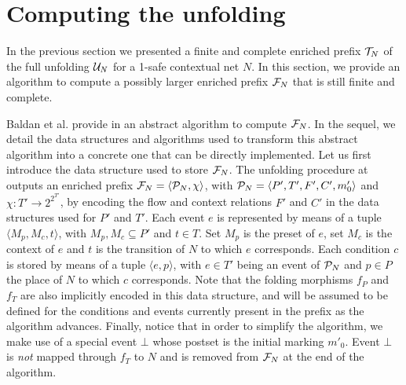 \documentclass[11pt,a4paper]{article}
\begin{document}
\section{Computing the unfolding}
\label{sec:computing.unfolding}

In the previous section we presented a finite and complete enriched prefix
$\mathcal{T}_{N}$ of the full unfolding $\mathcal{U}_{N}$ for a 1-safe contextual net $N$.  In
this section, we provide an algorithm to compute a possibly larger enriched
prefix $\mathcal{F}_{N}$ that is still finite and complete.

Baldan et al. provide in  an abstract algorithm to compute $\mathcal{F}_{N}$.  In the sequel, we detail the data structures and algorithms used to
transform this abstract algorithm into a concrete one that can be directly
implemented.  Let us first introduce the data structure used to store $\mathcal{F}_{N}$.
The unfolding procedure at  outputs an enriched
prefix $\mathcal{F}_{N} = \langle \mathcal{P}_{N}, \chi \rangle$, with $\mathcal{P}_{N} = \langle P',
T', F', C', m'_0 \rangle$ and $\chi : T' \to 2^{2^{T'}}$, by encoding the flow
and context relations $F'$ and $C'$ in the data structures used for $P'$ and
$T'$.  Each event $e$ is represented by means of a tuple $\langle M_p, M_c, t
\rangle$, with $M_p, M_c \subseteq P'$ and $t \in T$.  Set $M_p$ is the preset
of $e$, set $M_c$ is the context of $e$ and $t$ is the transition of $N$ to
which $e$ corresponds.  Each condition $c$ is stored by means of a tuple
$\langle e, p \rangle$, with $e \in T'$ being an event of $\mathcal{P}_{N}$ and $p \in
P$ the place of $N$ to which $c$ corresponds.  Note that the folding morphisms
$f_P$ and $f_T$ are also implicitly encoded in this data structure, and will be
assumed to be defined for the conditions and events currently present in the
prefix as the algorithm advances.  Finally, notice that in order to simplify
the algorithm, we make use of a special event $\bot$ whose postset is the
initial marking $m'_0$.  Event $\bot$ is \emph{not} mapped through $f_T$ to $N$
and is removed from $\mathcal{F}_{N}$ at the end of the algorithm.
\end{document}
